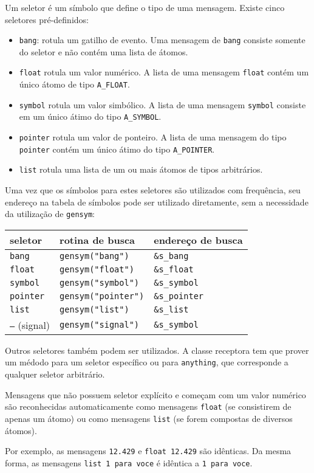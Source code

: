 Um seletor é um símbolo que define o tipo de uma mensagem. Existe cinco
seletores pré-definidos:

\begin{itemize}
  \item \texttt{bang}: rotula um gatilho de evento. Uma mensagem de
    \texttt{bang} consiste somente do seletor e não contém uma lista de átomos.
  \item \texttt{float} rotula um valor numérico. A lista de uma mensagem
    \texttt{float} contém um único átomo de tipo \texttt{A\_FLOAT}.
  \item \texttt{symbol} rotula um valor simbólico. A lista de uma mensagem
    \texttt{symbol} consiste em um único átimo do tipo \texttt{A\_SYMBOL}.
  \item \texttt{pointer} rotula um valor de ponteiro. A lista de uma mensagem do
    tipo \texttt{pointer} contém um único átimo do tipo \texttt{A\_POINTER}.
  \item \texttt{list} rotula uma lista de um ou mais átomos de tipos arbitrários.
\end{itemize}

Uma vez que os símbolos para estes seletores são utilizados com frequência,
seu endereço na tabela de símbolos pode ser utilizado diretamente, sem a
necessidade da utilização de \texttt{gensym}:

\begin{center}
\begin{tabular}{|l|l|l|}
\hline
  seletor & rotina de busca & endereço de busca \\
\hline
  \texttt{bang} & \texttt{gensym("bang")} & \texttt{\&s\_bang} \\
  \texttt{float} & \texttt{gensym("float")} & \texttt{\&s\_float} \\
  \texttt{symbol} & \texttt{gensym("symbol")} & \texttt{\&s\_symbol} \\
  \texttt{pointer} & \texttt{gensym("pointer")} & \texttt{\&s\_pointer} \\
  \texttt{list} & \texttt{gensym("list")} & \texttt{\&s\_list} \\
  \texttt{--}  (signal) & \texttt{gensym("signal")} & \texttt{\&s\_symbol} \\
\hline
\end{tabular}
\end{center}

Outros seletores também podem ser utilizados. A classe receptora tem que
prover um médodo para um seletor específico ou para \texttt{anything}, que
corresponde a qualquer seletor arbitrário.

Mensagens que não possuem seletor explícito e começam com um valor numérico
são reconhecidas automaticamente como mensagens \texttt{float} (se consistirem
de apenas um átomo) ou como mensagens \texttt{list} (se forem compostas de
diversos átomos).

Por exemplo, as mensagens \texttt{12.429} e \texttt{float 12.429} são
idênticas. Da mesma forma, as mensagens \texttt{list 1 para voce} é idêntica a
\texttt{1 para voce}.

